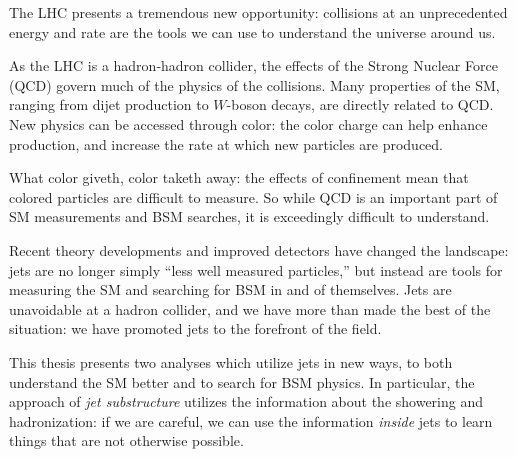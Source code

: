 \label{chapter:introduction}

The LHC presents a tremendous new opportunity: collisions at an unprecedented energy and rate are the tools we can use to understand the universe around us.

As the LHC is a hadron-hadron collider, the effects of the Strong Nuclear Force (QCD) govern much of the physics of the collisions. Many properties of the SM, ranging from dijet production to $W$-boson decays, are directly related to QCD. New physics can be accessed through color: the color charge can help enhance production, and increase the rate at which new particles are produced.

What color giveth, color taketh away: the effects of confinement mean that colored particles are difficult to measure. So while QCD is an important part of SM measurements and BSM searches, it is exceedingly difficult to understand.

Recent theory developments and improved detectors have changed the landscape: jets are no longer simply ``less well measured particles,'' but instead are tools for measuring the SM and searching for BSM in and of themselves. Jets are unavoidable at a hadron collider, and we have more than made the best of the situation: we have promoted jets to the forefront of the field.

This thesis presents two analyses which utilize jets in new ways, to both understand the SM better and to search for BSM physics. In particular, the approach of \textit{jet substructure} utilizes the information about the showering and hadronization: if we are careful, we can use the information \textit{inside} jets to learn things that are not otherwise possible.